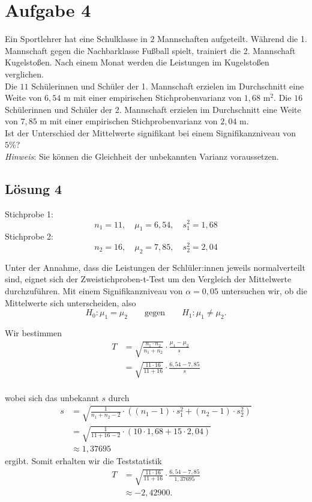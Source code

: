\documentclass[main.tex]{subfiles}
\begin{document}
\section{Aufgabe 4}
Ein Sportlehrer hat eine Schulklasse in $2$ Mannschaften aufgeteilt. Während die 1. Mannschaft gegen die Nachbarklasse Fußball spielt, trainiert die 2. Mannschaft Kugelstoßen. Nach einem Monat werden die Leistungen im Kugelstoßen verglichen. \\[2mm]
%
Die $11$ Schülerinnen und Schüler der 1. Mannschaft erzielen im Durchschnitt eine Weite von $6,54$ m mit einer empirischen Stichprobenvarianz von $1,68$ m$^{2}$. Die $16$ Schülerinnen und Schüler der 2. Mannschaft erzielen im Durchschnitt eine Weite von $7,85$ m mit einer empirischen Stichprobenvarianz von $2,04$ m. \\[2mm]
%
Ist der Unterschied der Mittelwerte signifikant bei einem Signifikanzniveau von $5\%$? \\[2mm]
%
\textit{Hinweis}: Sie können die Gleichheit der unbekannten Varianz voraussetzen.

\subsection{Lösung 4}

Stichprobe 1: $$
n_1=11,\quad \mu_1 = 6,54,\quad s_1^2=1,68
$$
Stichprobe 2: $$
n_2=16,\quad \mu_2 = 7,85,\quad s_2^2=2,04
$$

Unter der Annahme, dass die Leistungen der Schlüler:innen jeweils normalverteilt sind, eignet sich der Zweistichproben-t-Test um den Vergleich der Mittelwerte durchzuführen. Mit einem Signifikanzniveau von $\alpha = 0,05$ untersuchen wir, ob die Mittelwerte sich unterscheiden, also $$
    H_0: \mu_1 = \mu_2 \qquad \text{gegen} \qquad H_1: \mu_1 \neq \mu_2.
$$

Wir bestimmen $$\begin{aligned}
    T &= \sqrt{\frac{n_1\cdot n_2}{n_1+n_2}} \cdot \frac{\mu_1 - \mu_2}{s} \\
    &= \sqrt{\frac{11\cdot 16}{11+16}} \cdot \frac{6,54 - 7,85}{s} \\
\end{aligned}$$

wobei sich das unbekannt $s$ durch $$\begin{aligned}
    s &= \sqrt{\frac{1}{n_1+n_2 -2} \cdot \left((n_1 - 1) \cdot s^2_1 + (n_2 - 1) \cdot s^2_2\right)} \\[3mm]
    &= \sqrt{\frac{1}{11 + 16 -2} \cdot \left(10\cdot 1,68 + 15\cdot 2,04\right)} \\[3mm]
    &\approx 1,37695
\end{aligned}$$
ergibt. Somit erhalten wir die Teststatistik
$$\begin{aligned}
    T &= \sqrt{\frac{11\cdot 16}{11+16}} \cdot \frac{6,54 - 7,85}{1,37695} \\
    &\approx -2,42900.
\end{aligned}$$
\end{document}
